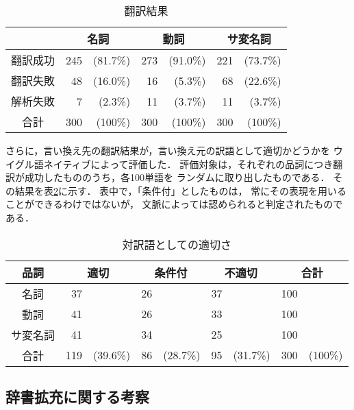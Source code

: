    \begin{table}[tb]
	 \caption{\label{ujresult3}翻訳結果}
	\begin{center}
	 \begin{tabular}{c|rr|rr|rr} \hline
	  & \multicolumn{2}{c|}{名詞} & \multicolumn{2}{c|}{動詞} & \multicolumn{2}{c}{サ変名詞}\\
	  \hline
	  翻訳成功 & 245 &(81.7\%) & 273 &(91.0\%)& 221 &(73.7\%)\\
	  翻訳失敗 & 48 &(16.0\%)& 16 &(5.3\%)& 68&(22.6\%)\\
	  解析失敗 & 7 &(2.3\%)& 11 &(3.7\%)& 11&(3.7\%)\\
	  \hline
	  合計 & 300 &(100\%)& 300 &(100\%)& 300&(100\%)\\
	  \hline
	 \end{tabular}
	\end{center}
   \end{table}

   さらに，言い換え先の翻訳結果が，言い換え元の訳語として適切かどうかを
   ウイグル語ネイティブによって評価した．
   評価対象は，それぞれの品詞につき翻訳が成功したもののうち，各100単語を
   ランダムに取り出したものである．
   その結果を表\ref{ujresult4}に示す．
   表中で，「条件付」としたものは，
   常にその表現を用いることができるわけではないが，
   文脈によっては認められると判定されたものである．

   \begin{table}[tb]
	 \caption{\label{ujresult4}対訳語としての適切さ}
	\begin{center}
	 \begin{tabular}{c|rr|rr|rr|rr} \hline
	  品詞     & \multicolumn{2}{c|}{適切} & \multicolumn{2}{c|}{条件付} & \multicolumn{2}{c|}{不適切}     & \multicolumn{2}{c}{合計}  \\ \hline 
	  名詞     &   37 & &26 &      & 37   &    & 100 &\\ 
	  動詞     &   41 & &26       & &33       & &100 &\\ 
	  サ変名詞 &   41 & &34 &      & 25   &    & 100 &\\ \hline
	  合計 &   119 & (39.6\%) & 86 & (28.7\%)  & 95 & (31.7\%)  & 300& (100\%) \\ \hline
	 \end{tabular}
	\end{center}
   \end{table}


   \subsection{辞書拡充に関する考察}

